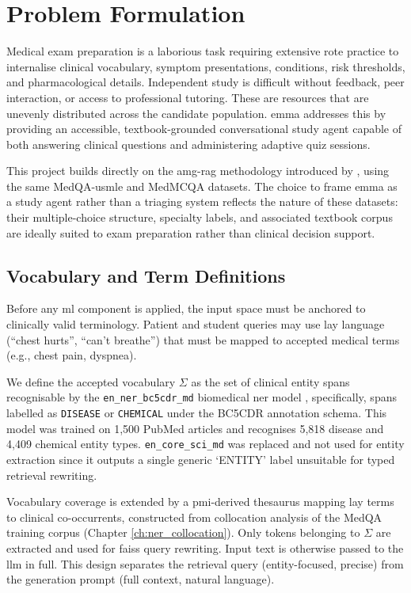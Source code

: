 \chapter{Problem Formulation}

Medical exam preparation is a laborious task requiring extensive rote practice to internalise clinical vocabulary, symptom presentations, conditions, risk thresholds, and pharmacological details. Independent study is difficult without feedback, peer interaction, or access to professional tutoring. These are resources that are unevenly distributed across the candidate population. \gls{emma} addresses this by providing an accessible, textbook-grounded conversational study agent capable of both answering clinical questions and administering adaptive quiz sessions. 

This project builds directly on the \gls{amg-rag} methodology introduced by \citet{rezaei_agentic_2025}, using the same MedQA-\gls{usmle} and MedMCQA datasets. The choice to frame \gls{emma} as a study agent rather than a triaging system reflects the nature of these datasets: their multiple-choice structure, specialty labels, and associated textbook corpus are ideally suited to exam preparation rather than clinical decision support.

\section{Vocabulary and Term Definitions}

Before any \gls{ml} component is applied, the input space must be anchored to clinically valid terminology. Patient and student queries may use lay language (``chest hurts'', ``can't breathe'') that must be mapped to accepted medical terms (e.g., chest pain, dyspnea).

We define the accepted vocabulary $\Sigma$ as the set of clinical entity spans recognisable by the \texttt{en\_ner\_bc5cdr\_md} biomedical \gls{ner} model \cite{neumann_scispacy_2019}, specifically, spans labelled as \texttt{DISEASE} or \texttt{CHEMICAL} under the BC5CDR annotation schema. This model was trained on 1,500 PubMed articles and recognises 5,818 disease and 4,409 chemical entity types. \texttt{en\_core\_sci\_md} was replaced and not used for entity extraction since it outputs a single generic `ENTITY' label unsuitable for typed retrieval rewriting. 

Vocabulary coverage is extended by a \gls{pmi}-derived thesaurus mapping lay terms to clinical co-occurrents, constructed from collocation analysis of the MedQA training corpus (Chapter \ref{ch:ner_collocation}). Only tokens belonging to $\Sigma$ are extracted and used for \gls{faiss} query rewriting. Input text is otherwise passed to the \gls{llm} in full. This design separates the retrieval query (entity-focused, precise) from the generation prompt (full context, natural language).

